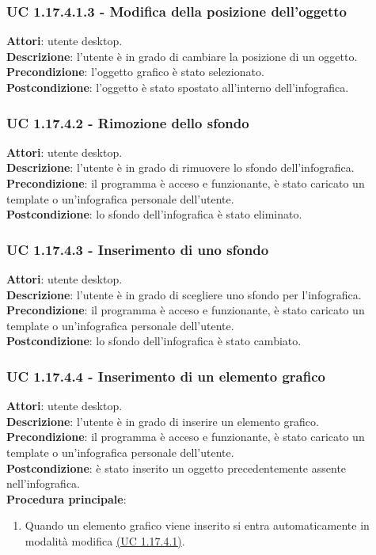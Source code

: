 {\subsubsection{UC 1.17.4.1.3 - Modifica della posizione dell'oggetto}{
	\label{uc1.17.4.1.3}
	\textbf{Attori}: utente desktop. \\
	\textbf{Descrizione}: l'utente è in grado di cambiare la posizione di un oggetto. \\
	\textbf{Precondizione}: l'oggetto grafico è stato selezionato.\\
	\textbf{Postcondizione}: l'oggetto è stato spostato all’interno dell’infografica.	\\
	}
\subsubsection{UC 1.17.4.2 - Rimozione dello sfondo}{
	\label{uc1.17.4.2}
	\textbf{Attori}: utente desktop. \\
	\textbf{Descrizione}: l'utente è in grado di rimuovere lo sfondo dell’infografica. \\
	\textbf{Precondizione}: il programma è acceso e funzionante, è stato caricato un template o un'infografica personale dell'utente.	\\
	\textbf{Postcondizione}: lo sfondo dell'infografica è stato eliminato.	\\
	}
\subsubsection{UC 1.17.4.3 - Inserimento di uno sfondo}{
	\label{uc1.17.4.3}
	\textbf{Attori}: utente desktop. \\
	\textbf{Descrizione}: l'utente è in grado di scegliere uno sfondo per l'infografica. \\
	\textbf{Precondizione}: il programma è acceso e funzionante, è stato caricato un template o un'infografica personale dell'utente.	\\
	\textbf{Postcondizione}: lo sfondo dell'infografica è stato cambiato.	\\
	}
\subsubsection{UC 1.17.4.4 - Inserimento di un elemento grafico}{
	\label{uc1.17.4.4}
	\textbf{Attori}: utente desktop. \\
	\textbf{Descrizione}: l'utente è in grado di inserire un elemento grafico. \\
	\textbf{Precondizione}: il programma è acceso e funzionante, è stato caricato un template o un'infografica personale dell'utente.	\\
	\textbf{Postcondizione}: è stato inserito un oggetto precedentemente assente nell'infografica.	\\
	\textbf{Procedura principale}:
	\begin{enumerate}
		\item Quando un elemento grafico viene inserito si entra automaticamente in modalità modifica \hyperref[uc1.17.4.1]{(UC 1.17.4.1)}.
	\end{enumerate}
	}
}
